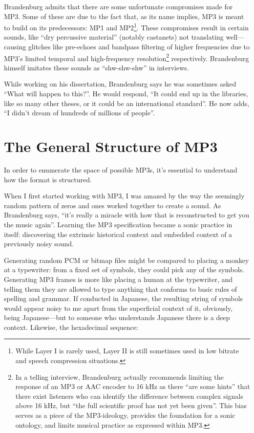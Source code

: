 \documentclass{thesis}
\begin{document}
Brandenburg admits that there are some unfortunate compromises made for MP3. Some of these are due to the fact that, as its name implies, MP3 is meant to build on its predecessors: MP1 and MP2\footnote{While Layer I is rarely used, Layer II is still sometimes used in low bitrate and speech compression situations.}. These compromises result in certain sounds, like ``dry percussive material'' (notably castanets) not translating well\cite{karlheinz_brandenburg_mp3_1999}---causing glitches like pre-echoes and bandpass filtering of higher frequencies due to MP3's limited temporal and high-frequency resolution\footnote{In a telling interview, Brandenburg actually recommends limiting the response of an MP3 or AAC encoder to 16 kHz as there ``are some hints'' that there exist listeners who can identify the difference between complex signals above 16 kHz, but ``the full scientific proof has not yet been given''.\cite[10]{karlheinz_brandenburg_mp3_1999} This bias serves as a piece of the MP3-ideology, provides the foundation for a sonic ontology, and limits musical practice as expressed within MP3.} respectively. Brandenburg himself imitates these sounds as ``shw-shw-shw'' in interviews.

While working on his dissertation, Brandenburg says he was sometimes asked ``What will happen to this?''. He would respond, ``It could end up in the libraries, like so many other theses, or it could be an international standard''. He now adds, ``I didn't dream of hundreds of millions of people''.
	
\section{The General Structure of MP3}

In order to enumerate the space of possible MP3s, it's essential to understand how the format is structured.

When I first started working with MP3, I was amazed by the way the seemingly random pattern of zeros and ones worked together to create a sound. As Brandenburg says, ``it's really a miracle with how that is reconstructed to get you the music again''\cite{tom_merritt_real_2010}. Learning the MP3 specification became a sonic practice in itself: discovering the extrinsic historical context and embedded context of a previously noisy sound.

Generating random PCM or bitmap files might be compared to placing a monkey at a typewriter: from a fixed set of symbols, they could pick any of the symbols. Generating MP3 frames is more like placing a human at the typewriter, and telling them they are allowed to type anything that conforms to basic rules of spelling and grammar. If conducted in Japanese, the resulting string of symbols would appear noisy to me apart from the superficial context of it, obviously, being Japanese---but to someone who understands Japanese there is a deep context. Likewise, the hexadecimal sequence:
	
\end{document}
